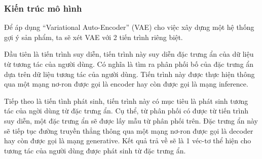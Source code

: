 

    \subsubsection{Kiến trúc mô hình}
    \label{vae_arch}
    
    Để áp dụng ``Variational Auto-Encoder'' (VAE) cho việc xây dựng một hệ thống gợi ý sản phẩm, ta sẽ xét VAE với 2 tiến trình riêng biệt. 

    Đầu tiên là tiến trình suy diễn, tiến trình này suy diễn đặc trưng ẩn của dữ liệu từ tương tác của người dùng.
    Có nghĩa là tìm ra phân phối bố của đặc trưng ẩn dựa trên dữ liệu tương tác của người dùng. 
    Tiến trình này được thực hiện thông qua một mạng nơ-ron được gọi là encoder hay còn được gọi là mạng inference.
    
    Tiếp theo là tiến tình phát sinh, tiến trình này có mục tiêu là phát sinh tương tác của ngời dùng từ đặc trưng ẩn.
    Cụ thể, từ phân phối có được từ tiến trình suy diễn, một đặc trưng ẩn sẽ được lấy mẫu từ phân phối trên. 
    Đặc trưng ẩn này sẽ tiếp tục đường truyền thẳng thông qua một mạng nơ-ron được gọi là decoder hay còn được gọi là mạng generative.
    Kết quả trả về sẽ là 1 véc-tơ thể hiện cho tương tác của người dùng được phát sinh từ đặc trưng ẩn.


